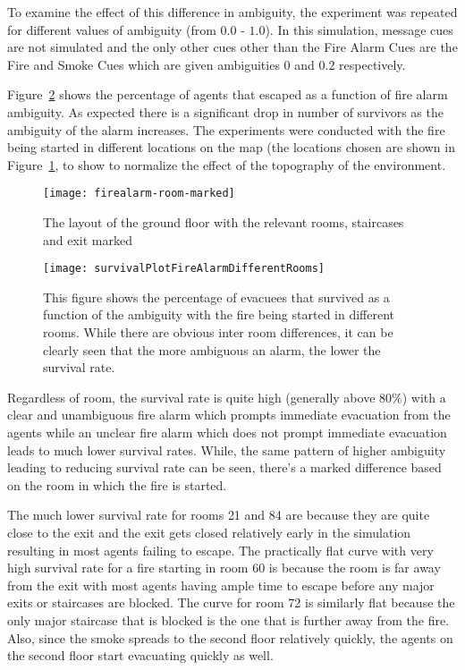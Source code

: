 To examine the effect of this difference in ambiguity, the experiment was repeated for different values of ambiguity (from $0.0$ - $1.0$). In this simulation, message cues are not simulated and the only other cues other than the Fire Alarm Cues are the Fire and Smoke Cues which are given ambiguities $0$ and $0.2$ respectively.

Figure~\ref{fig:SurvivalPlotDifferentRooms} shows the percentage of agents that escaped as a function of fire alarm ambiguity. As expected there is a significant drop in number of survivors as the ambiguity of the alarm increases. The experiments were conducted with the fire being started in different locations on the map (the locations chosen are shown in Figure~\ref{fig:RoomLayoutAnnotated}, to show to normalize the effect of the topography of the environment.

\begin{figure}[!tb]
	\centering
		\texttt{[image: firealarm-room-marked]}

	\caption{The layout of the ground floor with the relevant rooms, staircases and exit marked}
	\label{fig:RoomLayoutAnnotated}
\end{figure}
\begin{figure}[!tb]
	\centering
		\texttt{[image: survivalPlotFireAlarmDifferentRooms]}

	\caption{This figure shows the percentage of evacuees that survived as a function of the ambiguity with the fire being started in different rooms. While there are obvious inter room differences, it can be clearly seen that the more ambiguous an alarm, the lower the survival rate.}
	\label{fig:SurvivalPlotDifferentRooms}
\end{figure}

Regardless of room, the survival rate is quite high (generally above 80\%) with a clear and unambiguous fire alarm which prompts immediate evacuation from the agents while an unclear fire alarm which does not prompt immediate evacuation leads to much lower survival rates. While, the same pattern of higher ambiguity leading to reducing survival rate can be seen, there's a marked difference based on the room in which the fire is started.

The much lower survival rate for rooms 21 and 84 are because they are quite close to the exit and the exit gets closed relatively early in the simulation resulting in most agents failing to escape. The practically flat curve with very high survival rate for a fire starting in room 60 is because the room is far away from the exit with most agents having ample time to escape before any major exits or staircases are blocked. The curve for room 72 is similarly flat because the only major staircase that is blocked is the one that is further away from the fire. Also, since the smoke spreads to the second floor relatively quickly, the agents on the second floor start evacuating quickly as well.

